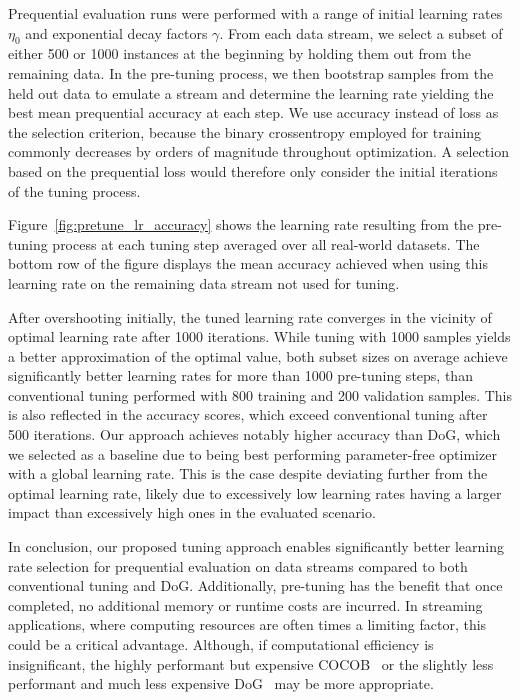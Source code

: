 \documentclass[runningheads]{llncs}
\begin{document}
Prequential evaluation runs were performed with a range of initial learning rates $\eta_0$ and exponential decay factors $\gamma$.
From each data stream, we select a subset of either 500 or 1000 instances at the beginning by holding them out from the remaining data.
In the pre-tuning process, we then bootstrap samples from the held out data to emulate a stream and determine the learning rate yielding the best mean prequential accuracy at each step.
We use accuracy instead of loss as the selection criterion, because the binary crossentropy employed for training commonly decreases by orders of magnitude throughout optimization.
A selection based on the prequential loss would therefore only consider the initial iterations of the tuning process.

Figure~\ref{fig:pretune_lr_accuracy} shows the learning rate resulting from the pre-tuning process at each tuning step averaged over all real-world datasets.
The bottom row of the figure displays the mean accuracy achieved when using this learning rate on the remaining data stream not used for tuning.

After overshooting initially, the tuned learning rate converges in the vicinity of optimal learning rate after 1000 iterations.
While tuning with 1000 samples yields a better approximation of the optimal value, both subset sizes on average achieve significantly better learning rates for more than 1000 pre-tuning steps, than conventional tuning performed with 800 training and 200 validation samples.
This is also reflected in the accuracy scores, which exceed conventional tuning after 500 iterations.
Our approach achieves notably higher accuracy than DoG, which we selected as a baseline due to being best performing parameter-free optimizer with a global learning rate.
This is the case despite deviating further from the optimal learning rate, likely due to excessively low learning rates having a larger impact than excessively high ones in the evaluated scenario.


In conclusion, our proposed tuning approach enables significantly better learning rate selection for prequential evaluation on data streams compared to both conventional tuning and DoG.
Additionally, pre-tuning has the benefit that once completed, no additional memory or runtime costs are incurred.
In streaming applications, where computing resources are often times a limiting factor, this could be a critical advantage.
Although, if computational efficiency is insignificant, the highly performant but expensive COCOB~\cite{orabonaTrainingDeepNetworks2017} or the slightly less performant and much less expensive DoG~\cite{ivgiDoGSGDBest2023} may be more appropriate.
\end{document}
